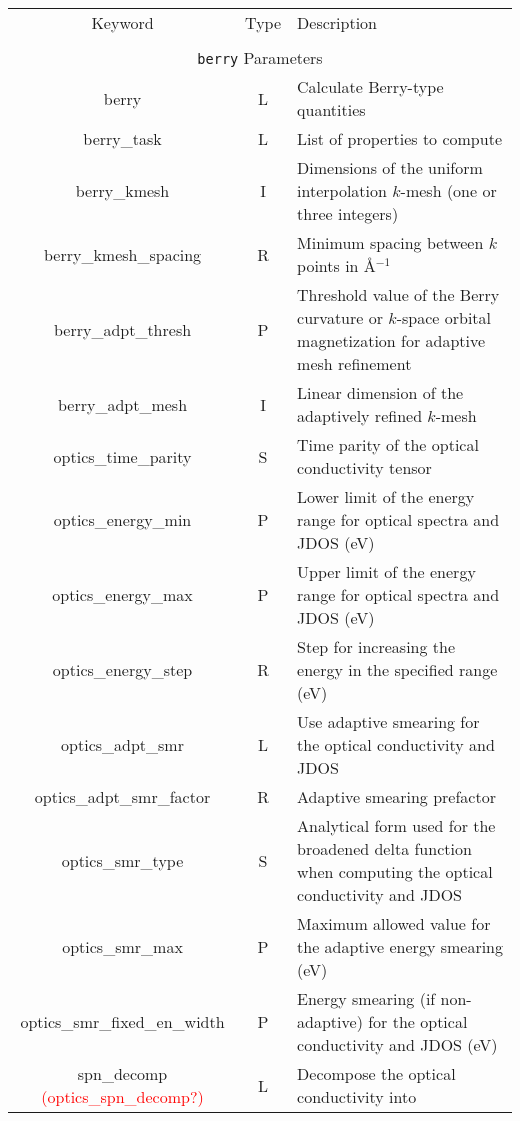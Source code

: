\begin{table}[hH!]
\begin{center}
\begin{tabular}{|c|c|p{6cm}|}
  \hline
  Keyword & Type & Description \\
  &      &             \\
  \hline\hline
  \multicolumn{3}{|c|}{{\tt berry} Parameters} \\
  \hline
  {\sc berry}  & L & Calculate Berry-type quantities \\
  {\sc berry\_task}& L  & List of properties to compute \\
  {\sc berry\_kmesh} & I & Dimensions of the uniform interpolation $k$-mesh 
  (one or three integers)\\ 
  {\sc berry\_kmesh\_spacing}& R & Minimum spacing between $k$ points in 
  \AA$^{-1}$\\
  {\sc berry\_adpt\_thresh} & P & Threshold value of the Berry curvature or 
  $k$-space orbital magnetization for adaptive mesh refinement\\ 
  {\sc berry\_adpt\_mesh} & I & Linear dimension of the adaptively refined 
  $k$-mesh\\ 
  {\sc optics\_time\_parity}& S & Time parity of the optical conductivity tensor\\ 
  {\sc optics\_energy\_min} & P & Lower limit of the energy range for
  optical spectra and JDOS (eV) \\
  {\sc optics\_energy\_max}& P & Upper limit of the energy range for
  optical spectra and JDOS (eV) \\
  {\sc optics\_energy\_step}& R &  Step for increasing the energy in the 
  specified range (eV)\\
  {\sc optics\_adpt\_smr} & L & Use adaptive smearing for the 
  optical conductivity and JDOS \\
  {\sc optics\_adpt\_smr\_factor} & R & Adaptive smearing prefactor \\
  {\sc optics\_smr\_type} & S & Analytical form used for the broadened delta function
  when computing the optical conductivity and JDOS\\  
  {\sc optics\_smr\_max} & P & Maximum allowed value for the 
  adaptive energy smearing (eV) \\
  {\sc optics\_smr\_fixed\_en\_width} & P  & Energy smearing (if non-adaptive)
  for the optical conductivity and JDOS (eV) \\
  {\sc spn\_decomp} \textcolor{red}{({\sc optics\_spn\_decomp}?)}& L & Decompose the optical conductivity into

\end{tabular}
\end{center}
\end{table}

